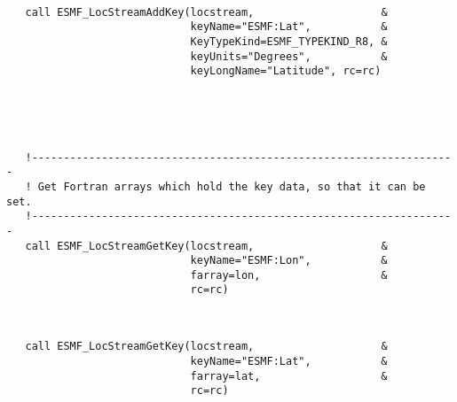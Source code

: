 
 \begin{verbatim}

   call ESMF_LocStreamAddKey(locstream,                    &
                             keyName="ESMF:Lat",           &
                             KeyTypeKind=ESMF_TYPEKIND_R8, &
                             keyUnits="Degrees",           &
                             keyLongName="Latitude", rc=rc)

 
\end{verbatim}
 

 \begin{verbatim}


   !-------------------------------------------------------------------
   ! Get Fortran arrays which hold the key data, so that it can be set. 
   !-------------------------------------------------------------------
   call ESMF_LocStreamGetKey(locstream,                    &
                             keyName="ESMF:Lon",           &
                             farray=lon,                   &
                             rc=rc)
 
\end{verbatim}
 

 \begin{verbatim}

   call ESMF_LocStreamGetKey(locstream,                    &
                             keyName="ESMF:Lat",           &
                             farray=lat,                   &
                             rc=rc)

 
\end{verbatim}
 

